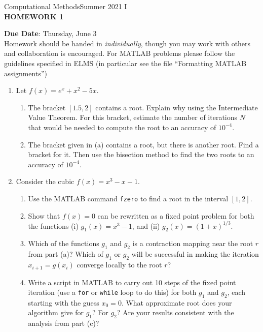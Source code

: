 \documentclass[12pt]{article}
\begin{document}
\begin{center}
Computational Methods\qquad Summer 2021 I
\\

\textbf{\large HOMEWORK 1}\\
\end{center}
\noindent \textbf{Due Date}: Thursday, June 3\\

\noindent Homework should be handed in \emph{individually}, though you may work with others and collaboration is encouraged. For MATLAB problems please follow the guidelines specified in ELMS (in particular see the file ``Formatting MATLAB assignments'')

\begin{enumerate}
\item Let $f(x) = e^x + x^2 - 5x$.
	\begin{enumerate}
	\item The bracket $[1.5,2]$ contains a root. Explain why using the Intermediate Value Theorem. For this bracket, estimate the number of iterations $N$ that would be needed to compute the root to an accuracy of $10^{-4}$.
	\item The bracket given in (a) contains a root, but there is another root. Find a bracket for it. Then use the bisection method to find the two roots to an accuracy of $10^{-4}$.
	\end{enumerate}
\item Consider the cubic $f(x)=x^3-x-1$. 
	\begin{enumerate}
	\item Use the MATLAB command \texttt{fzero} to find a root in the interval $[1,2]$.
	\item Show that $f(x)=0$ can be rewritten as a fixed point problem for both the functions (i) $g_1(x)=x^3-1$, and (ii) $g_2(x)=(1+x)^{1/3}$. 
	\item Which of the functions $g_1$ and $g_2$ is a contraction mapping near the root $r$ from part (a)? Which of $g_1$ or $g_2$ will be successful in making the iteration $x_{i+1} = g(x_i)$ converge locally to the root $r$?
	\item Write a script in MATLAB to carry out 10 steps of the fixed point iteration (use a \texttt{for} or \texttt{while} loop to do this) for both $g_1$ and $g_2$, each starting with the guess $x_0=0$. What approximate root does your algorithm give for $g_1$? For $g_2$? Are your results consistent with the analysis from part (c)? 
	\end{enumerate}
\end{enumerate}
\end{document}
